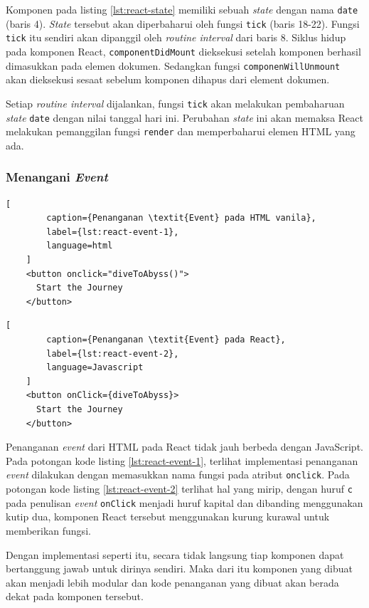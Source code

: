     Komponen pada listing \ref{lst:react-state} memiliki sebuah \textit{state}
    dengan nama \texttt{date} (baris 4). \textit{State} tersebut akan
    diperbaharui oleh fungsi \texttt{tick} (baris 18-22). Fungsi \texttt{tick}
    itu sendiri akan dipanggil oleh \textit{routine interval} dari baris 8.
    Siklus hidup pada komponen React, \texttt{componentDidMount} dieksekusi
    setelah komponen berhasil dimasukkan pada elemen dokumen. Sedangkan fungsi
    \texttt{componenWillUnmount} akan dieksekusi sesaat sebelum komponen dihapus
    dari element dokumen.
    
    Setiap \textit{routine interval} dijalankan, fungsi \texttt{tick} akan
    melakukan pembaharuan \textit{state} \texttt{date} dengan nilai tanggal hari
    ini. Perubahan \textit{state} ini akan memaksa React melakukan pemanggilan
    fungsi \texttt{render} dan memperbaharui elemen HTML yang ada.
    
    \subsubsection{Menangani \textit{Event}}
    \begin{lstlisting}[
        caption={Penanganan \textit{Event} pada HTML vanila}, 
        label={lst:react-event-1}, 
        language=html
    ]
    <button onclick="diveToAbyss()">
      Start the Journey
    </button>
    \end{lstlisting}
    
    \begin{lstlisting}[
        caption={Penanganan \textit{Event} pada React}, 
        label={lst:react-event-2}, 
        language=Javascript
    ]
    <button onClick={diveToAbyss}>
      Start the Journey
    </button>
    \end{lstlisting}
    
    Penanganan \textit{event} dari HTML pada React tidak jauh berbeda dengan
    JavaScript. Pada potongan kode listing \ref{lst:react-event-1}, terlihat
    implementasi penanganan \textit{event} dilakukan dengan memasukkan nama
    fungsi pada atribut \texttt{onclick}. Pada potongan kode listing
    \ref{lst:react-event-2} terlihat hal yang mirip, dengan huruf \texttt{c} pada
    penulisan \textit{event} \texttt{onClick} menjadi huruf kapital dan dibanding menggunakan
    kutip dua, komponen React tersebut menggunakan kurung kurawal untuk memberikan
    fungsi.
    
    Dengan implementasi seperti itu, secara tidak langsung tiap komponen dapat
    bertanggung jawab untuk dirinya sendiri. Maka dari itu komponen yang dibuat
    akan menjadi lebih modular dan kode penanganan yang dibuat akan berada dekat
    pada komponen tersebut.
    
